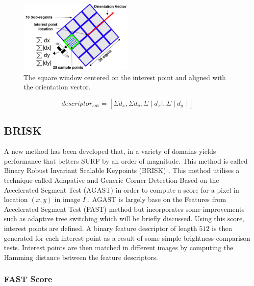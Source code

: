 \documentclass[11pt]{report}
\begin{document}
\begin{figure}[h!] 
  \centering
    \includegraphics[width=0.5\textwidth]{../Drawings/methods/SURF2D_Descriptor.jpg}
    \caption{The square window centered on the interest point and aligned with the orientation vector.}
    \label{fig:reproducibleAxes}
\end{figure}

\begin{equation}
descriptor_{sub} = [\Sigma d_x, \Sigma d_y,  \Sigma \mid d_x \mid , \Sigma \mid d_y \mid] 
\label{eqn:descriptorSub}
\end{equation} 



\subsection{BRISK}
\label{sec:brisk}
A new method has been developed that, in a variety of domains yields performance that betters SURF by an order of magnitude. This method is called Binary Robust Invariant Scalable Keypoints (BRISK) \cite{Leutenegger2011}. This method utilises a technique called Adapative and Generic Corner Detection Based on the Accelerated Segment Test (AGAST) in order to compute a score for a pixel in location $(x,y)$ in image $I$ \cite{Mair2010}. AGAST is largely base on the Features from Accelerated Segment Test (FAST) \cite{Rosten2006} method but incorporates some improvements such as adaptive tree switching which will be briefly discussed. Using this score, interest points are defined. A binary feature descriptor of length $512$ is then generated for each interest point as a result of some simple brightness comparison tests. Interest points are then matched in different images by computing the Hamming distance between the feature descriptors. \\

\subsubsection{FAST Score}
\label{sec:fastScore}
\end{document}
